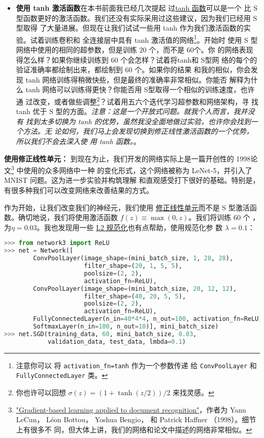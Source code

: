 \begin{itemize}
\item \textbf{使用 tanh 激活函数}\quad 在本书前面我已经几次提起
  过\hyperref[subsec:other_models_of_artificial_neuron]{tanh 函数}可以是一个
  比 S型函数更好的激活函数。我们还没有实际采用过这些建议，因为我们已经用 S 型取得
  了大量进展。但现在让我们试试一些用 tanh 作为我们激活函数的实验。试着训练卷积和
  全连接层中具有 tanh 激活值的网络\footnote{注意你可以
    将 \lstinline!activation_fn=tanh! 作为一个参数传递
    给 \lstinline!ConvPoolLayer! 和 \lstinline!FullyConnectedLayer! 类。}。开始时
  使用 S 型网络中使用的相同的超参数，但是训练 $20$ 个\epochs{}，而不是 $60$个。你
  的网络表现得怎么样？如果你继续训练到 $60$ 个\epochs{}会怎样？试着将tanh和 S型网
  络的每个\epoch{}的验证准确率都绘制出来，都绘制到 $60$ 个\epochs{}。如果你的结果
  和我的相似，你会发现 tanh 网络训练得稍微快些，但是最终的准确率非常相似。你能否
  解释为什么 tanh 网络可以训练得更快？你能否用 S型取得一个相似的训练速度，也许通
  过改变\learningrate{}，或者做些调整\footnote{你也许可以回想 $\sigma(z) =
    (1+\tanh(z/2))/2$ 来找灵感。}？试着用五六个迭代学习超参数和网络架构，寻
  找 tanh 优于 S 型的方面。\emph{注意：这是一个开放式问题。就我个人而言，我并没有
    找到太多切换为 tanh 的优势，虽然我没全面地做过实验，也许你会找到一个方法。无
    论如何，我们马上会发现切换到修正线性激活函数的一个优势，所以我们不会去深入使
    用 tanh 函数。}。
\end{itemize}

\textbf{使用修正线性单元：} 到现在为止，我们开发的网络实际上是一篇开创性的 1998论
文\footnote{\href{http://yann.lecun.com/exdb/publis/pdf/lecun-98.pdf}{"Gradient-based learning applied to document recognition"}，作者为 Yann
  LeCun， Léon Bottou， Yoshua Bengio， 和 Patrick Haffner （1998）。细节上有很多不
  同，但大体上讲，我们的网络和论文中描述的网络非常相似。} 中使用的众多网络中一种
的变化形式，这个网络被称为 LeNet-5，并引入了 MNIST 问题。这为进一步实验并构筑理解
和直观感受打下很好的基础。特别是，有很多种我们可以改变网络来改善结果的方式。

作为开始，让我们改变我们的神经元，我们使用%
\hyperref[sec:other_models_of_artificial_neuron]{修正线性单元}而不是 S 型激活函
数。确切地说，我们将使用激活函数 $f(z) \equiv \max(0, z)$。我们将训练 $60$ 个
\epochs{}，\learningrate{}为$\eta = 0.03$。我也发现用一些
\hyperref[sec:overfitting_and_regularization]{L2 规范化}也有点帮助，使用规范化参
数 $\lambda = 0.1$：
\begin{lstlisting}[language=Python]
>>> from network3 import ReLU
>>> net = Network([
        ConvPoolLayer(image_shape=(mini_batch_size, 1, 28, 28), 
                      filter_shape=(20, 1, 5, 5), 
                      poolsize=(2, 2), 
                      activation_fn=ReLU),
        ConvPoolLayer(image_shape=(mini_batch_size, 20, 12, 12), 
                      filter_shape=(40, 20, 5, 5), 
                      poolsize=(2, 2), 
                      activation_fn=ReLU),
        FullyConnectedLayer(n_in=40*4*4, n_out=100, activation_fn=ReLU),
        SoftmaxLayer(n_in=100, n_out=10)], mini_batch_size)
>>> net.SGD(training_data, 60, mini_batch_size, 0.03, 
            validation_data, test_data, lmbda=0.1)
\end{lstlisting}

